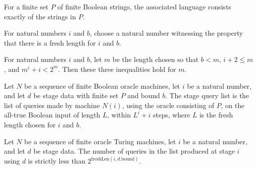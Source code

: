 \begin{definition}
\label{Complexity.posOracle}
\leanok
For a finite set $P$ of finite Boolean strings, the associated language consists exactly
of the strings in $P$.
\end{definition}

\begin{definition}
\label{Complexity.freshLen}
\leanok
{}
For natural numbers $i$ and $b$, choose a natural number witnessing the property that
there is a fresh length for $i$ and $b$.
\end{definition}

\begin{theorem}
\label{Complexity.freshLen_spec}
\leanok
{}
For natural numbers $i$ and $b$, let $m$ be the length chosen so that $b<m$, $i+2\le m$,
and $m^i+i<2^m$. Then these three inequalities hold for $m$.
\end{theorem}

\begin{definition}
\label{Complexity.stageQ}
\leanok
{}
Let $N$ be a sequence of finite Boolean oracle machines, let $i$ be a natural number,
and let $d$ be stage data with finite set $P$ and bound $b$. The stage query list is the
list of queries made by machine $N(i)$, using the oracle consisting of $P$, on the
all-true Boolean input of length $L$, within $L^i+i$ steps, where $L$ is the fresh
length chosen for $i$ and $b$.
\end{definition}

\begin{theorem}
\label{Complexity.stageQ_length}
\leanok
{}
Let $N$ be a sequence of finite oracle Turing machines, let $i$ be a natural number, and
let $d$ be stage data. The number of queries in the list produced at stage $i$ using $d$
is strictly less than $2^{\mathrm{freshLen}(i,d.\mathrm{bound})}$.
\end{theorem}

